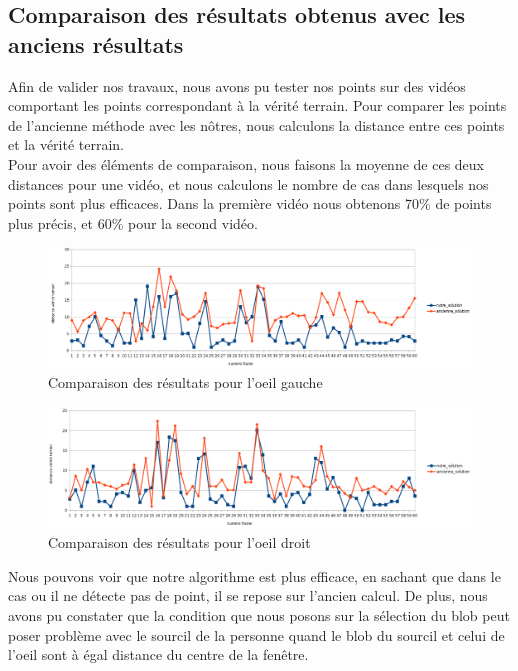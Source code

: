 \subsection{Comparaison des résultats obtenus avec les anciens résultats}
Afin de valider nos travaux, nous avons pu tester nos points sur des vidéos comportant les points correspondant à
la vérité terrain. Pour comparer les points de l'ancienne méthode avec les nôtres, nous calculons la
distance entre ces points et la vérité terrain.\\

Pour avoir des éléments de comparaison, nous faisons la moyenne de ces deux distances pour une vidéo, et nous calculons
le nombre de cas dans lesquels nos points sont plus efficaces. Dans la première vidéo nous obtenons 70\% de points plus précis, et
60\% pour la second vidéo.\\

\begin{figure}[H]
  \includegraphics[width=17cm]{resultat/resultat_gauche.png}
  \caption{Comparaison des résultats pour l'oeil gauche}
\end{figure}

\begin{figure}[H]
  \includegraphics[width=17cm]{resultat/resultat_droit.png}
  \caption{Comparaison des résultats pour l'oeil droit}
\end{figure}

Nous pouvons voir que notre algorithme est plus efficace, en sachant que dans le cas ou il ne détecte pas de point, il se repose sur l'ancien
calcul. De plus, nous avons pu constater que la condition que nous posons sur la sélection du blob peut poser problème 
avec le sourcil de la personne quand le blob du sourcil et celui de l'oeil sont à égal distance du centre de la fenêtre.\\

